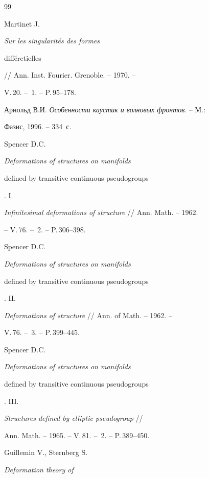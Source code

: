 \begin{thebibliography}{99}







Martinet J. {\em Sur les singularit\'es des formes


diff\'eretielles} // Ann. Inst. Fourier. Grenoble. -- 1970. --


V.\,20. -- \No\,1. -- P.\,95--178.







Арнольд В.И. {\em Особенности каустик и волновых фронтов}. -- М.:


Фазис, 1996. -- 334~с.







Spencer D.C. {\em Deformations of structures on manifolds


defined by transitive continuous pseudogroups}. I.


{\em Infinitesimal deformations of structure} // Ann. Math. -- 1962.


-- V.\,76. -- \No\,2. -- P.\,306--398.







Spencer D.C. {\em Deformations of structures on manifolds


defined by transitive continuous pseudogroups}. II.


{\em Deformations of structure} // Ann. of Math. -- 1962. --


V.\,76. -- \No\,3. -- P.\,399--445.







Spencer D.C. {\em Deformations of structures on manifolds


defined by transitive continuous pseudogroups}. III.


{\em Structures defined by elliptic pseudogroup} //


Ann. Math. -- 1965. -- V.\,81. -- \No\,2. -- P.\,389--450.







Guillemin V., Sternberg S. {\em Deformation theory of


}
\end{thebibliography}
